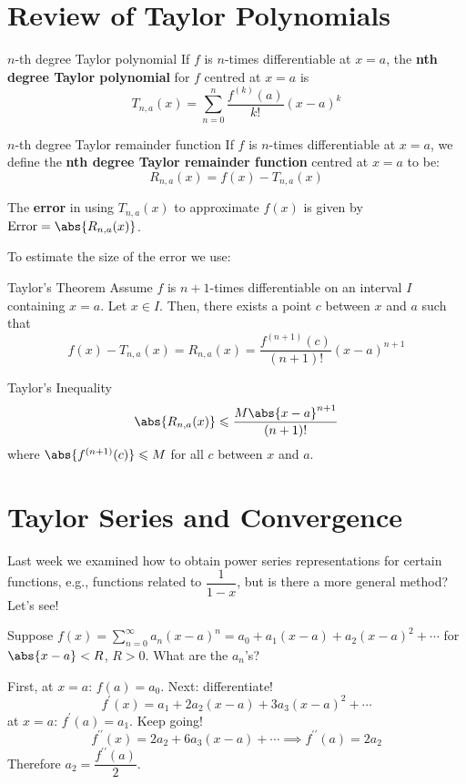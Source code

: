 \setcounter{section}{4}
\section{Review of Taylor Polynomials}
\begin{Definition}{$ n $-th degree Taylor polynomial}{}
    If $ f $ is $ n $-times differentiable at $ x=a $,
    the \textbf{nth degree Taylor polynomial} for $ f $
    centred at $ x=a $ is
    \[ T_{n,a}(x)=\sum\limits_{n=0}^{n} \frac{f^{(k)}(a)}{k!} (x-a)^k \]
\end{Definition}

\begin{Definition}{$ n $-th degree Taylor remainder function}{}
    If $ f $ is $ n $-times differentiable at $ x=a $, we define
    the \textbf{nth degree Taylor remainder function} centred at
    $ x=a $ to be:
    \[ R_{n,a}(x)=f(x)-T_{n,a}(x) \]
\end{Definition}
The \textbf{error} in using $ T_{n,a}(x) $ to approximate
$ f(x) $ is given by $ \text{Error}=\abs{R_{n,a}(x)} $.

To estimate the size of the error we use:
\begin{Theorem}{Taylor's Theorem}{}
    Assume $ f $ is $ n+1 $-times differentiable on an interval
    $ I $ containing $ x=a $. Let $ x\in I $. Then, there exists
    a point $ c $ between $ x $ and $ a $ such that
    \[ f(x)-T_{n,a}(x)=R_{n,a}(x)=
        \frac{f^{(n+1)}(c)}{(n+1)!}(x-a)^{n+1}  \]
\end{Theorem}

\begin{Corollary}{Taylor's Inequality}{}
    \[ \abs{R_{n,a}(x)}\leqslant \frac{M\abs{x-a}^{n+1}}{(n+1)!} \]
    where $ \abs{f^{(n+1)}(c)}\leqslant M $ for all $ c $
    between $ x $ and $ a $.
\end{Corollary}

\setcounter{section}{6}
\section{Taylor Series and Convergence}
Last week we examined how to obtain power series representations
for certain functions, e.g., functions related to $ \dfrac{1}{1-x} $,
but is there a more general method? Let's see!

Suppose $ f(x)=\sum\limits_{n=0}^{\infty} a_n(x-a)^n=a_0+a_1(x-a)+a_2(x-a)^2+\cdots $
for $ \abs{x-a}<R $, $ R>0 $. What are the $ a_n $'s?

First, at $ x=a $: $ f(a)=a_0 $. Next: differentiate!
\[ f^\prime(x)=a_1+2a_2(x-a)+3a_3(x-a)^2+\cdots \]
at $ x=a $: $ f^\prime(a)=a_1 $. Keep going!
\[ f^{\prime\prime}(x)=2a_2+6a_3(x-a)+\cdots\implies f^{\prime\prime}(a)=2a_2 \]
Therefore $ a_2=\dfrac{f^{\prime\prime}(a)}{2} $.

